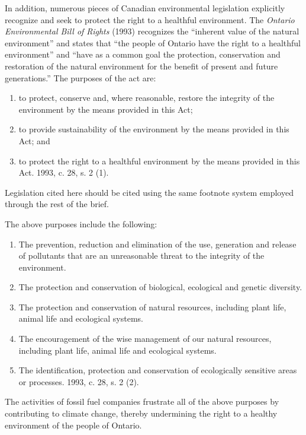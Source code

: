 In addition, numerous pieces of Canadian environmental legislation explicitly recognize and seek to protect the right to a healthful environment.
The \emph{Ontario Environmental Bill of Rights} (1993) recognizes the ``inherent value of the natural environment'' and states that ``the people of Ontario have the right to a healthful environment'' and ``have as a common goal the protection, conservation and restoration of the natural environment for the benefit of present and future generations.''  
The purposes of the act are:
\begin{enumerate}
	\item to protect, conserve and, where reasonable, restore the integrity of the environment by the means provided in this Act;
	\item to provide sustainability of the environment by the means provided in this Act; and
	\item to protect the right to a healthful environment by the means provided in this Act.  1993, c. 28, s. 2 (1).
\end{enumerate}

\begin{vcom}
	Legislation cited here should be cited using the same \latex footnote system employed through the rest of the brief.
\end{vcom}


The above purposes include the following:
\begin{enumerate}
	\item The prevention, reduction and elimination of the use, generation and release of pollutants that are an unreasonable threat to the integrity of the environment.
	\item The protection and conservation of biological, ecological and genetic diversity.
	\item The protection and conservation of natural resources, including plant life, animal life and ecological systems.
	\item The encouragement of the wise management of our natural resources, including plant life, animal life and ecological systems.
	\item The identification, protection and conservation of ecologically sensitive areas or processes.  1993, c. 28, s. 2 (2). 
\end{enumerate}



The activities of fossil fuel companies frustrate all of the above purposes by contributing to climate change, thereby undermining the right to a healthy environment of the people of Ontario.

